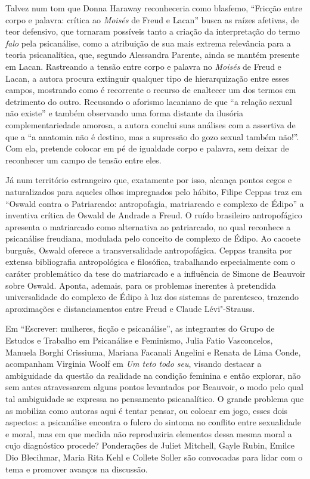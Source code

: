 Talvez num tom que Donna Haraway reconheceria como blasfemo, ``Fricção
entre corpo e palavra: crítica ao \emph{Moisés} de Freud e Lacan'' busca as
raízes afetivas, de teor defensivo, que tornaram possíveis tanto a
criação da interpretação do termo \emph{falo} pela psicanálise, como a
atribuição de sua mais extrema relevância para a teoria psicanalítica,
que, segundo Alessandra Parente, ainda se mantém presente em Lacan.
Rastreando a tensão entre corpo e palavra no \emph{Moisés} de Freud e
Lacan, a autora procura extinguir qualquer tipo de hierarquização entre
esses campos, mostrando como é recorrente o recurso de enaltecer um dos
termos em detrimento do outro. Recusando o aforismo lacaniano de que ``a
relação sexual não existe'' e também observando uma forma distante da
ilusória complementariedade amorosa, a autora conclui suas análises com
a assertiva de que a ``a anatomia não é destino, mas a supressão do gozo
sexual também não!''. Com ela, pretende colocar em pé de igualdade corpo
e palavra, sem deixar de reconhecer um campo de tensão entre eles.

Já num território estrangeiro que, exatamente por isso, alcança pontos
cegos e naturalizados para aqueles olhos impregnados pelo hábito, Filipe
Ceppas traz em ``Oswald contra o Patriarcado: antropofagia, matriarcado
e complexo de Édipo'' a inventiva crítica de Oswald de Andrade a Freud.
O ruído brasileiro antropofágico apresenta o matriarcado como
alternativa ao patriarcado, no qual reconhece a psicanálise freudiana,
modulada pelo conceito de complexo de Édipo. Ao cacoete burguês, Oswald
oferece a transversalidade antropofágica. Ceppas transita por extensa
bibliografia antropológica e filosófica, trabalhando especialmente com o
caráter problemático da tese do matriarcado e a influência de Simone de Beauvoir
sobre Oswald. Aponta, ademais, para os problemas inerentes à pretendida
universalidade do complexo de Édipo à luz dos sistemas de parentesco,
trazendo aproximações e distanciamentos entre Freud e Claude Lévi"-Strauss.

Em ``Escrever: mulheres, ficção e psicanálise'', as integrantes do Grupo
de Estudos e Trabalho em Psicanálise e Feminismo, Julia Fatio
Vasconcelos, Manuela Borghi Crissiuma, Mariana Facanali Angelini e Renata
de Lima Conde, acompanham Virginia Woolf em \emph{Um teto todo seu}, visando
destacar a ambiguidade da questão da realidade na condição feminina e
então explorar, não sem antes atravessarem alguns pontos levantados por
Beauvoir, o modo pelo qual tal ambiguidade se expressa no
pensamento psicanalítico. O grande problema que as mobiliza como autoras
aqui é tentar pensar, ou colocar em jogo, esses dois aspectos: a
psicanálise encontra o fulcro do sintoma no conflito entre sexualidade e
moral, mas em que medida não reproduziria elementos dessa mesma moral a
cujo diagnóstico procede? Ponderações de Juliet Mitchell, Gayle Rubin,
Emilce Dio Blecihmar, Maria Rita Kehl e Collete Soller são convocadas
para lidar com o tema e promover avanços na discussão.

